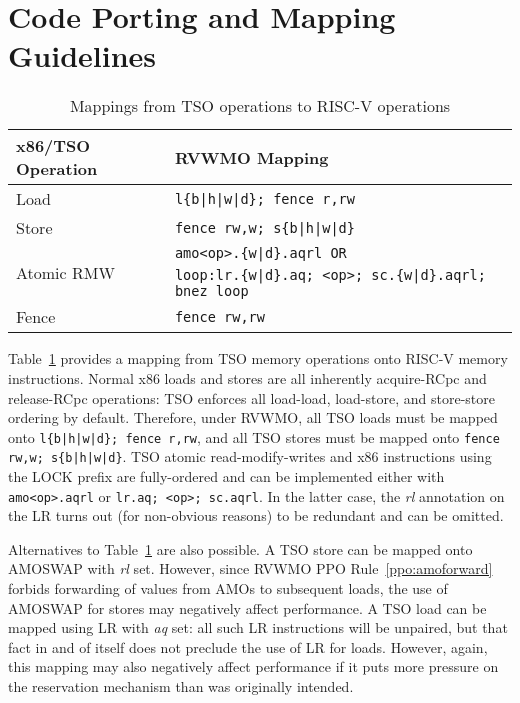 \section{Code Porting and Mapping Guidelines}
\label{sec:porting}

\begin{table}[h!]
  \centering
  \begin{tabular}{|l|l|}
    \hline
    x86/TSO Operation & RVWMO Mapping \\
    \hline
    \hline
    Load              & \tt l\{b|h|w|d\}; fence r,rw               \\
    \hline
    Store             & \tt fence rw,w; s\{b|h|w|d\}               \\
    \hline
    \multirow{2}{*}{Atomic RMW}
    & \tt amo<op>.\{w|d\}.aqrl \textrm{OR} \\
    & \tt loop:\@ lr.\{w|d\}.aq; <op>; sc.\{w|d\}.aqrl; bnez loop \\
    \hline
    Fence             & \tt fence rw,rw \\
    \hline
  \end{tabular}
  \caption{Mappings from TSO operations to RISC-V operations}
  \label{tab:tsomappings}
\end{table}

Table~\ref{tab:tsomappings} provides a mapping from TSO memory operations onto RISC-V memory instructions.
Normal x86 loads and stores are all inherently acquire-RCpc and release-RCpc operations: TSO enforces all load-load, load-store, and store-store ordering by default.
Therefore, under RVWMO, all TSO loads must be mapped onto {\tt l\{b|h|w|d\}; fence r,rw}, and all TSO stores must be mapped onto {\tt fence rw,w; s\{b|h|w|d\}}.
TSO atomic read-modify-writes and x86 instructions using the LOCK prefix are fully-ordered and can be implemented either with {\tt amo<op>.aqrl} or {\tt lr.aq; <op>; sc.aqrl}.
In the latter case, the {\em rl} annotation on the LR turns out (for non-obvious reasons) to be redundant and can be omitted.

Alternatives to Table~\ref{tab:tsomappings} are also possible.
A TSO store can be mapped onto AMOSWAP with {\em rl} set.
However, since RVWMO PPO Rule~\ref{ppo:amoforward} forbids forwarding of values from AMOs to subsequent loads, the use of AMOSWAP for stores may negatively affect performance.
A TSO load can be mapped using LR with {\em aq} set: all such LR instructions will be unpaired, but that fact in and of itself does not preclude the use of LR for loads.
However, again, this mapping may also negatively affect performance if it puts more pressure on the reservation mechanism than was originally intended.

